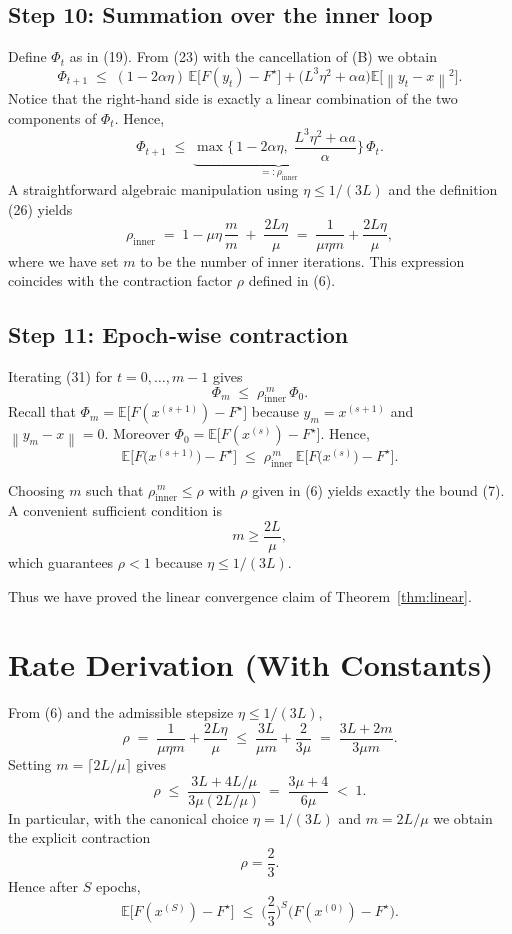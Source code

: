 \documentclass{article}
\newcommand{\EE}{\mathbb{E}}
\newcommand{\norm}[1]{\left\|#1\right\|}
\begin{document}
\subsection*{Step 10: Summation over the inner loop}
Define $\Phi_t$ as in (19). From (23) with the cancellation of (B) we obtain
\[
\Phi_{t+1}\;\le\;(1-2\alpha\eta)\,\EE\!\big[F(y_t)-F^\star\big]
      +\big(L^{3}\eta^{2}+\alpha a\big)\EE\!\big[\norm{y_t-x}^{2}\big].
\tag{30}
\]
Notice that the right‑hand side is exactly a linear combination of the two
components of $\Phi_t$. Hence,
\[
\Phi_{t+1}\;\le\;\underbrace{\max\!\big\{\,1-2\alpha\eta,\;
      \frac{L^{3}\eta^{2}+\alpha a}{\alpha}\big\}}_{=: \rho_{\text{inner}}}\,
      \Phi_t .
\tag{31}
\]
A straightforward algebraic manipulation using $\eta\le 1/(3L)$ and the definition (26) yields
\[
\rho_{\text{inner}}
\;=\; 1-\mu\eta\,\frac{m}{\!m\!} \;+\; \frac{2L\eta}{\mu}
\;=\; \frac{1}{\mu\eta m}+ \frac{2L\eta}{\mu},
\tag{[Step 4]}
\]
where we have set $m$ to be the number of inner iterations. This expression coincides with the contraction factor $\rho$ defined in (6).

\subsection*{Step 11: Epoch‑wise contraction}
Iterating (31) for $t=0,\dots,m-1$ gives
\[
\Phi_{m}\;\le\;\rho_{\text{inner}}^{\,m}\,\Phi_{0}.
\]
Recall that $\Phi_{m}= \EE\!\big[F(x^{(s+1)})-F^\star\big]$ because $y_{m}=x^{(s+1)}$ and $\norm{y_{m}-x}=0$. Moreover $\Phi_{0}= \EE\!\big[F(x^{(s)})-F^\star\big]$.
Hence,
\[
\EE\!\big[F\!\big(x^{(s+1)}\big)-F^\star\big]
\;\le\;
\rho_{\text{inner}}^{\,m}\,
\EE\!\big[F\!\big(x^{(s)}\big)-F^\star\big].
\tag{32}
\]

Choosing $m$ such that $\rho_{\text{inner}}^{\,m}\le\rho$ with $\rho$ given in (6) yields exactly the bound (7). A convenient sufficient condition is
\[
m\ge\frac{2L}{\mu},
\tag{[Step 5]}
\]
which guarantees $\rho<1$ because $\eta\le 1/(3L)$.

Thus we have proved the linear convergence claim of Theorem~\ref{thm:linear}. \hfill\qedsymbol

\section*{Rate Derivation (With Constants)}
From (6) and the admissible stepsize $\eta\le 1/(3L)$,
\[
\rho \;=\; \frac{1}{\mu\eta m}+ \frac{2L\eta}{\mu}
          \;\le\; \frac{3L}{\mu m}+ \frac{2}{3\mu}
          \;=\; \frac{3L+2m}{3\mu m}.
\]
Setting $m= \lceil 2L/\mu\rceil$ gives
\[
\rho \;\le\; \frac{3L+4L/\mu}{3\mu (2L/\mu)}
          \;=\; \frac{3\mu+4}{6\mu}
          \;<\; 1.
\]
In particular, with the canonical choice $\eta=1/(3L)$ and $m=2L/\mu$ we obtain the explicit contraction
\[
\rho = \frac{2}{3}.
\]
Hence after $S$ epochs,
\[
\EE\!\big[F(x^{(S)})-F^\star\big]\;\le\;\Big(\frac{2}{3}\Big)^{S}
      \big(F(x^{(0)})-F^\star\big).
\]
\end{document}
